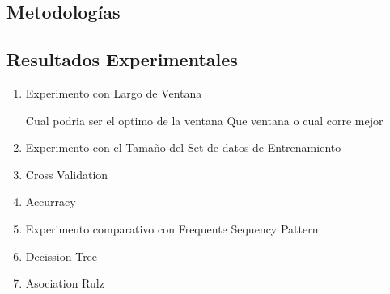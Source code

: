 


\subsection{Metodologías}





\subsection{Resultados Experimentales}


\begin{enumerate}
	
	\item Experimento con Largo de Ventana 
	
	Cual podria ser el optimo de la ventana
	Que ventana o cual corre mejor
	
	
	
	\item Experimento con el Tamaño del Set de datos de Entrenamiento
	
	
	\item Cross Validation
	
	
	\item Accurracy
	
	
	\item Experimento comparativo con Frequente Sequency Pattern
	
	\item Decission Tree
	
	\item Asociation Rulz
		
	
	
	
	
	
\end{enumerate}




